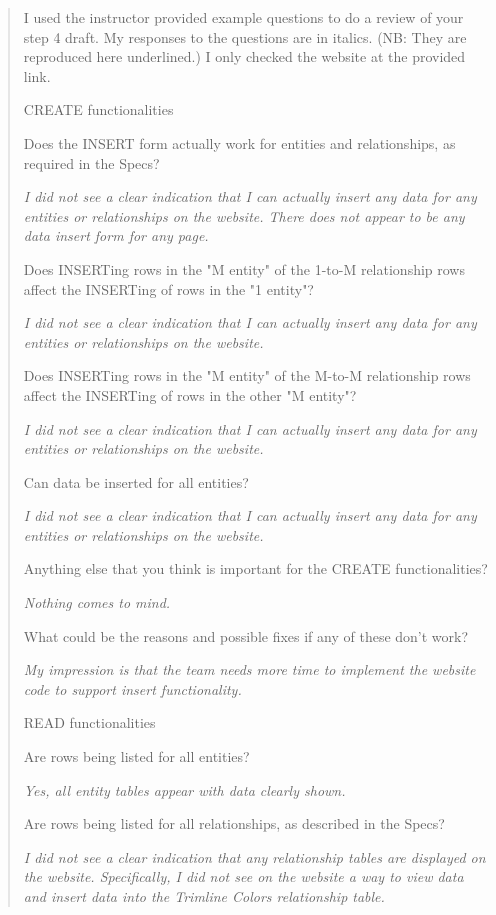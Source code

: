 \documentclass[11pt,letterpaper,oneside]{amsart}
\begin{document}
\begin{tcolorbox} \begin{quotation}

I used the instructor provided example questions to do a review of your step 4 draft. My responses to the questions are in italics. (NB: They are reproduced here underlined.) I only checked the website at the provided link.
 
CREATE functionalities

Does the INSERT form actually work for entities and relationships, as required in the Specs?

\emph{I did not see a clear indication that I can actually insert any data for any entities or relationships on the website. There does not appear to be any data insert form for any page.}

Does INSERTing rows in the "M entity" of the 1-to-M relationship rows affect the INSERTing of rows in the "1 entity"?

\emph{I did not see a clear indication that I can actually insert any data for any entities or relationships on the website.}

Does INSERTing rows in the "M entity" of the M-to-M relationship rows affect the INSERTing of rows in the other "M entity"?

\emph{I did not see a clear indication that I can actually insert any data for any entities or relationships on the website.}

Can data be inserted for all entities?

\emph{I did not see a clear indication that I can actually insert any data for any entities or relationships on the website.}

Anything else that you think is important for the CREATE functionalities?

\emph{Nothing comes to mind.}

What could be the reasons and possible fixes if any of these don't work?

\emph{My impression is that the team needs more time to implement the website code to support insert functionality.}

READ functionalities

Are rows being listed for all entities?

\emph{Yes, all entity tables appear with data clearly shown.}

Are rows being listed for all relationships, as described in the Specs?

\emph{I did not see a clear indication that any relationship tables are displayed on the website. Specifically, I did not see on the website a way to view data and insert data into the Trimline Colors relationship table.}


\end{quotation}
\end{tcolorbox}
\end{document}
